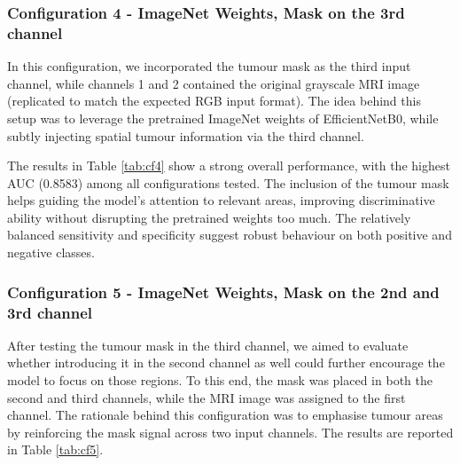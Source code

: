 \documentclass[12pt, a4paper]{report}
\begin{document}
\subsubsection{Configuration 4 - ImageNet Weights, Mask on the 3rd channel}

In this configuration, we incorporated the tumour mask as the third input channel, while channels 1 and 2 contained the original grayscale MRI image (replicated to match the expected RGB input format). The idea behind this setup was to leverage the pretrained ImageNet weights of EfficientNetB0, while subtly injecting spatial tumour information via the third channel.

\begin{table}[H]
\centering
{}
\caption{Configuration 4 - ImageNet weights, mask in the 3rd image channel}
\label{tab:cf4}
\end{table}

The results in Table \ref{tab:cf4} show a strong overall performance, with the highest AUC (0.8583) among all configurations tested. The inclusion of the tumour mask helps guiding the model's attention to relevant areas, improving discriminative ability without disrupting the pretrained weights too much. The relatively balanced sensitivity and specificity suggest robust behaviour on both positive and negative classes.


\subsubsection{Configuration 5 - ImageNet Weights, Mask on the 2nd and 3rd channel}

After testing the tumour mask in the third channel, we aimed to evaluate whether introducing it in the second channel as well could further encourage the model to focus on those regions. To this end, the mask was placed in both the second and third channels, while the MRI image was assigned to the first channel. The rationale behind this configuration was to emphasise tumour areas by reinforcing the mask signal across two input channels. The results are reported in Table \ref{tab:cf5}.
\end{document}
